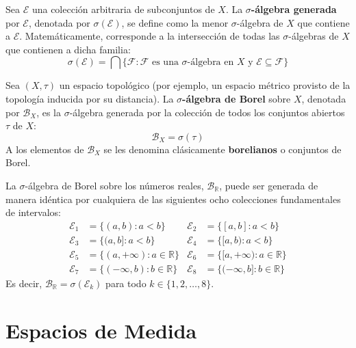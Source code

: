 \begin{definicion}
	Sea $\mathcal{E}$ una colección arbitraria de subconjuntos de $X$. La \textbf{$\sigma$-álgebra generada} por $\mathcal{E}$, denotada por $\sigma(\mathcal{E})$, se define como la menor $\sigma$-álgebra de $X$ que contiene a $\mathcal{E}$. Matemáticamente, corresponde a la intersección de todas las $\sigma$-álgebras de $X$ que contienen a dicha familia:
	$$ \sigma(\mathcal{E}) = \bigcap \{ \mathcal{F} : \mathcal{F} \text{ es una } \sigma\text{-álgebra en } X \text{ y } \mathcal{E} \subseteq \mathcal{F} \} $$
\end{definicion}

\begin{definicion}
	Sea $(X, \tau)$ un espacio topológico (por ejemplo, un espacio métrico provisto de la topología inducida por su distancia). La \textbf{$\sigma$-álgebra de Borel} sobre $X$, denotada por $\mathcal{B}_X$, es la $\sigma$-álgebra generada por la colección de todos los conjuntos abiertos $\tau$ de $X$:
	$$ \mathcal{B}_X = \sigma(\tau) $$
	A los elementos de $\mathcal{B}_X$ se les denomina clásicamente \textbf{borelianos} o conjuntos de Borel.
\end{definicion}

\begin{proposicion}
	La $\sigma$-álgebra de Borel sobre los números reales, $\mathcal{B}_\mathbb{R}$, puede ser generada de manera idéntica por cualquiera de las siguientes ocho colecciones fundamentales de intervalos:
	\begin{align*}
		\mathcal{E}_1 &= \{(a,b) : a < b\} & \mathcal{E}_2 &= \{[a,b] : a < b\} \\
		\mathcal{E}_3 &= \{(a,b] : a < b\} & \mathcal{E}_4 &= \{[a,b) : a < b\} \\
		\mathcal{E}_5 &= \{(a,+\infty) : a \in \mathbb{R}\} & \mathcal{E}_6 &= \{[a,+\infty) : a \in \mathbb{R}\} \\
		\mathcal{E}_7 &= \{(-\infty,b) : b \in \mathbb{R}\} & \mathcal{E}_8 &= \{(-\infty,b] : b \in \mathbb{R}\}
	\end{align*}
	Es decir, $\mathcal{B}_\mathbb{R} = \sigma(\mathcal{E}_k)$ para todo $k \in \{1, 2, \dots, 8\}$.
\end{proposicion}

\section{Espacios de Medida}

